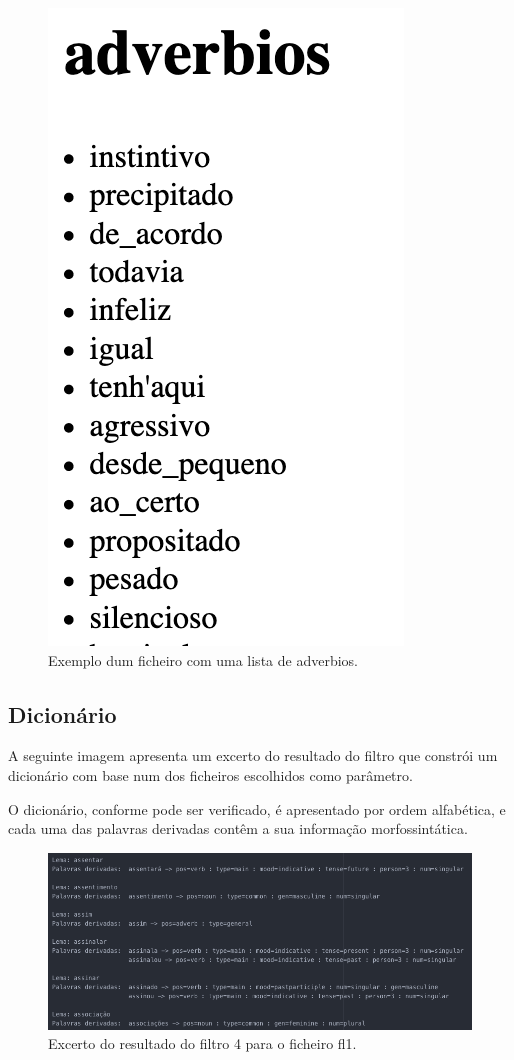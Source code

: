 \documentclass[11pt,a4paper]{report}
\begin{document}
\begin{figure}[H]
\centering
\includegraphics[scale=0.6]{adverbios.png}
\caption{Exemplo dum ficheiro com uma lista de adverbios.}
\label{img:adverbios}
\end{figure}

\newpage

\subsection{Dicionário}

A seguinte imagem apresenta um excerto do resultado do filtro que constrói um dicionário com base num dos ficheiros escolhidos como parâmetro.

O dicionário, conforme pode ser verificado, é apresentado por ordem alfabética, e cada uma das palavras derivadas contêm a sua informação morfossintática.

\begin{figure}[H]
\centering
\includegraphics[scale=0.5]{testes4.png}
\caption{Excerto do resultado do filtro 4 para o ficheiro fl1.}
\label{img:testes4}
\end{figure}
\end{document}
